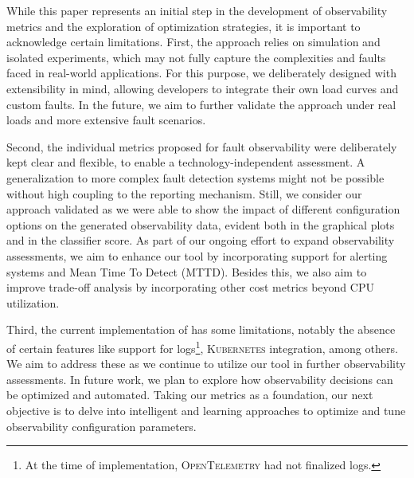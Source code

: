 While this paper represents an initial step in the development of observability metrics and the exploration of optimization strategies, it is important to acknowledge certain limitations. 
First, the approach relies on simulation and isolated experiments, which may not fully capture the complexities and faults faced in real-world applications. For this purpose, we deliberately designed \name{} with extensibility in mind, allowing developers to integrate their own load curves and custom faults. In the future, we aim to further validate the approach under real loads and more extensive fault scenarios.  

Second, the individual metrics proposed for fault observability were deliberately kept clear and flexible, to enable a technology-independent assessment. A generalization to more complex fault detection systems might not be possible without high coupling to the reporting mechanism.  Still, we consider our approach validated as we were able to show the impact of different configuration options on the generated observability data, evident both in the graphical plots and in the classifier score. As part of our ongoing effort to expand observability assessments, we aim to enhance our tool by incorporating support for alerting systems and Mean Time To Detect (MTTD). Besides this, we also aim to improve trade-off analysis by incorporating other cost metrics beyond CPU utilization.

Third, the current implementation of \name{} has some limitations, notably the absence of certain features like support for logs\footnote{At the time of implementation, \textsc{OpenTelemetry}  had not finalized logs.}, \textsc{Kubernetes} integration, among others. We aim to address these as we continue to utilize our tool in further observability assessments.
In future work, we plan to explore how observability decisions can be optimized and automated. Taking our metrics as a foundation, our next objective is to delve into intelligent and learning approaches to optimize and tune observability configuration parameters. 







